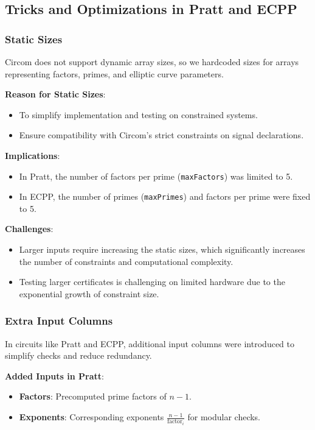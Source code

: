 \documentclass[12pt]{article}
\begin{document}
\subsection*{Tricks and Optimizations in Pratt and ECPP}

\subsubsection*{Static Sizes}
Circom does not support dynamic array sizes, so we hardcoded sizes for arrays representing factors, primes, and elliptic curve parameters. 

\textbf{Reason for Static Sizes}:
\begin{itemize}
    \item To simplify implementation and testing on constrained systems.
    \item Ensure compatibility with Circom's strict constraints on signal declarations.
\end{itemize}

\textbf{Implications}:
\begin{itemize}
    \item In Pratt, the number of factors per prime (\texttt{maxFactors}) was limited to 5.
    \item In ECPP, the number of primes (\texttt{maxPrimes}) and factors per prime were fixed to 5.
\end{itemize}

\textbf{Challenges}:
\begin{itemize}
    \item Larger inputs require increasing the static sizes, which significantly increases the number of constraints and computational complexity.
    \item Testing larger certificates is challenging on limited hardware due to the exponential growth of constraint size.
\end{itemize}

\subsubsection*{Extra Input Columns}
In circuits like Pratt and ECPP, additional input columns were introduced to simplify checks and reduce redundancy.

\textbf{Added Inputs in Pratt}:
\begin{itemize}
    \item \textbf{Factors}: Precomputed prime factors of \( n-1 \).
    \item \textbf{Exponents}: Corresponding exponents \( \frac{n-1}{\text{factor}_i} \) for modular checks.
\end{itemize}
\end{document}
